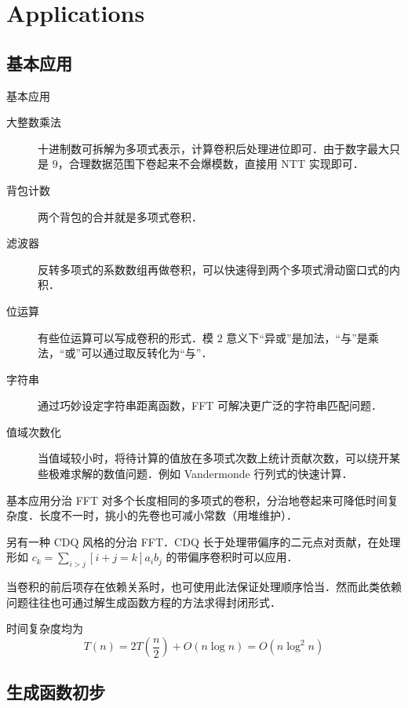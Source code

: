 \documentclass[fontset=fandol]{ctexbeamer}
\begin{document}
\section{Applications}

\subsection{基本应用}

\begin{frame}{基本应用}
    \begin{description}
        \item[大整数乘法] 十进制数可拆解为多项式表示，计算卷积后处理进位即可．由于数字最大只是 $9$，合理数据范围下卷起来不会爆模数，直接用 NTT 实现即可．
        \item[背包计数] 两个背包的合并就是多项式卷积．
        \item[滤波器] 反转多项式的系数数组再做卷积，可以快速得到两个多项式滑动窗口式的内积．
        \item[位运算] 有些位运算可以写成卷积的形式．模 $2$ 意义下“异或”是加法，“与”是乘法，“或”可以通过取反转化为“与”．
        \item[字符串] 通过巧妙设定字符串距离函数，FFT 可解决更广泛的字符串匹配问题．
        \item[值域次数化] 当值域较小时，将待计算的值放在多项式次数上统计贡献次数，可以绕开某些极难求解的数值问题．例如 Vandermonde 行列式的快速计算．
    \end{description}
\end{frame}

\begin{frame}{基本应用}{分治 FFT}
        对多个长度相同的多项式的卷积，分治地卷起来可降低时间复杂度．长度不一时，挑小的先卷也可减小常数（用堆维护）．

        另有一种 CDQ 风格的分治 FFT．CDQ 长于处理带偏序的二元点对贡献，在处理形如 $c_k = \sum_{i>j} [i+j=k] a_i b_j$ 的带偏序卷积时可以应用．
        
        当卷积的前后项存在依赖关系时，也可使用此法保证处理顺序恰当．然而此类依赖问题往往也可通过解生成函数方程的方法求得封闭形式．

        时间复杂度均为
        \[
        T(n) = 2 T \left( \frac n 2 \right) + O(n \log n) = O(n \log^2 n)
        \]
\end{frame}

\subsection{生成函数初步}
\end{document}
